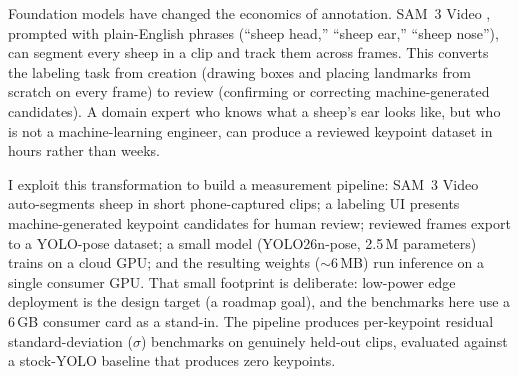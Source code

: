\documentclass[11pt]{article}
\begin{document}
Foundation models have changed the economics of annotation. SAM~3 Video
\citep{ravi2025sam3}, prompted with plain-English phrases (``sheep head,''
``sheep ear,'' ``sheep nose''), can segment every sheep in a clip and track
them across frames. This converts the labeling task from creation (drawing
boxes and placing landmarks from scratch on every frame) to review (confirming
or correcting machine-generated candidates). A domain expert who knows what a
sheep's ear looks like, but who is not a machine-learning engineer, can produce
a reviewed keypoint dataset in hours rather than weeks.

I exploit this transformation to build a measurement pipeline: SAM~3 Video
auto-segments sheep in short phone-captured clips; a labeling UI presents
machine-generated keypoint candidates for human review; reviewed frames export
to a YOLO-pose dataset; a small model (YOLO26n-pose, 2.5\,M parameters) trains
on a cloud GPU; and the resulting weights (${\sim}6$\,MB) run inference on a
single consumer GPU. That small footprint is deliberate: low-power edge
deployment is the design target (a roadmap goal), and the benchmarks here use a
6\,GB consumer card as a stand-in. The pipeline produces per-keypoint residual
standard-deviation ($\sigma$) benchmarks on genuinely held-out clips, evaluated
against a stock-YOLO baseline that produces zero keypoints.
\end{document}
